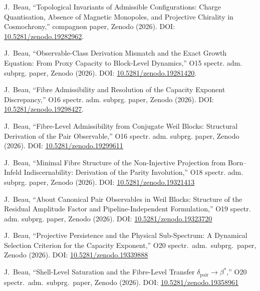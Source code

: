 J.~Beau,
``Topological Invariants of Admissible Configurations: Charge Quantisation, Absence of Magnetic Monopoles, and
Projective Chirality in Cosmochrony,''
compagnon paper, Zenodo (2026).
DOI: \href{https://doi.org/10.5281/zenodo.19282962}{10.5281/zenodo.19282962}.

J.~Beau,
``Observable-Class Derivation Mismatch and the Exact Growth Equation: From Proxy Capacity to Block-Level Dynamics,''
O15 spectr. adm. subprg. paper, Zenodo (2026).
DOI: \href{https://doi.org/10.5281/zenodo.19281420}{10.5281/zenodo.19281420}.

J.~Beau,
``Fibre Admissibility and Resolution of the Capacity Exponent Discrepancy,''
O16 spectr. adm. subprg. paper, Zenodo (2026).
DOI: \href{https://doi.org/10.5281/zenodo.19298427}{10.5281/zenodo.19298427}.

J.~Beau,
``Fibre-Level Admissibility from Conjugate Weil Blocks: Structural Derivation of the Pair Observable,''
O16 spectr. adm. subprg. paper, Zenodo (2026).
DOI: \href{https://doi.org/10.5281/zenodo.19299611}{10.5281/zenodo.19299611}

J.~Beau,
``Minimal Fibre Structure of the Non-Injective Projection from Born--Infeld Indiscernability:
Derivation of the Parity Involution,''
O18 spectr. adm. subprg. paper, Zenodo (2026).
DOI: \href{https://doi.org/10.5281/zenodo.19321413}{10.5281/zenodo.19321413}

J.~Beau,
``About Canonical Pair Observables in Weil Blocks: Structure of the Residual Amplitude Factor and Pipeline-Independent
Formulation,''
O19 spectr. adm. subprg. paper, Zenodo (2026).
DOI: \href{https://doi.org/10.5281/zenodo.19323720}{10.5281/zenodo.19323720}

J.~Beau,
``Projective Persistence and the Physical Sub-Spectrum: A
Dynamical Selection Criterion for the Capacity Exponent,''
O20 spectr.\ adm.\ subprg.\ paper, Zenodo (2026).
DOI: \href{https://doi.org/10.5281/zenodo.19339888}{10.5281/zenodo.19339888}

J.~Beau,
``Shell-Level Saturation and the Fibre-Level Transfer
$\delta_{\mathrm{pair}} \to \beta^*$,''
O20 spectr.\ adm.\ subprg.\ paper, Zenodo (2026).
DOI: \href{https://doi.org/10.5281/zenodo.19358961}{10.5281/zenodo.19358961}
